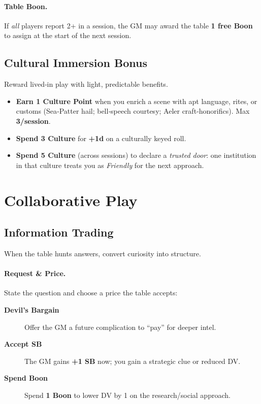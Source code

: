 \paragraph{Table Boon.}
If \emph{all} players report 2+ in a session, the GM may award the table \textbf{1 free Boon} to assign at the start of the next session.

\subsection{Cultural Immersion Bonus}
Reward lived‑in play with light, predictable benefits.
\begin{itemize}
  \item \textbf{Earn 1 Culture Point} when you enrich a scene with apt language, rites, or customs (Sea‑Patter hail; bell‑speech courtesy; Aeler craft‑honorifics). Max \textbf{3/session}.
  \item \textbf{Spend 3 Culture} for \textbf{+1d} on a culturally keyed roll.
  \item \textbf{Spend 5 Culture} (across sessions) to declare a \emph{trusted door}: one institution in that culture treats you as \textit{Friendly} for the next approach.
\end{itemize}

\section{Collaborative Play}

\subsection{Information Trading}
When the table hunts answers, convert curiosity into structure.

\paragraph{Request \& Price.}
State the question and choose a price the table accepts:
\begin{description}
  \item[\textbf{Devil's Bargain}] Offer the GM a future complication to “pay” for deeper intel.
  \item[\textbf{Accept SB}] The GM gains \textbf{+1 SB} now; you gain a strategic clue or reduced DV.
  \item[\textbf{Spend Boon}] Spend \textbf{1 Boon} to lower DV by 1 on the research/social approach.
\end{description}

